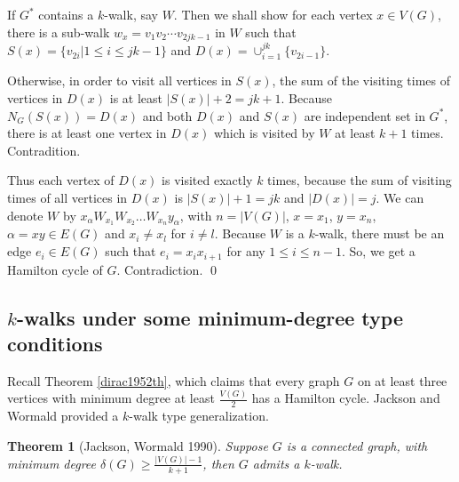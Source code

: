 \documentclass[12pt]{report}
\newtheorem{theorem}{Theorem}
\begin{document}
If $G^*$ contains a $k$-walk, say $W$. Then we shall show for each vertex $x\in V(G)$, there is a sub-walk $w_x=v_1v_2\cdots v_{2jk-1}$ in $W$ such that $S(x)=\{v_{2i}|1\le i\le jk-1\}$ and $D(x)=\cup_{i=1}^{jk}\{v_{2i-1}\}$.

Otherwise, in order to visit all vertices in $S(x)$, the sum of the visiting times of vertices in $D(x)$ is at least $|S(x)|+2=jk+1$. Because $N_G(S(x))=D(x)$ and both $D(x)$ and $S(x)$ are independent set in $G^*$, there is at least one vertex in $D(x)$ which is visited by $W$ at least $k+1$ times. Contradition.

Thus each vertex of $D(x)$ is visited exactly $k$ times, because the sum of visiting times of all vertices in $D(x)$ is $|S(x)|+1=jk$ and $|D(x)|=j$. We can denote $W$ by $x_{\alpha}W_{x_1}W_{x_2}\ldots W_{x_n}y_{\alpha}$, with $n=|V(G)|$, $x=x_1$, $y=x_n$, $\alpha=xy\in E(G)$ and $x_i\neq x_l$ for $i\neq l$. Because $W$ is a $k$-walk, there must be an edge $e_i\in E(G)$ such that $e_i=x_ix_{i+1}$ for any $1\le i\le n-1$. So, we get a Hamilton cycle of $G$. Contradiction.
\qed





































\subsection{$k$-walks under some minimum-degree type conditions}
Recall Theorem \ref{dirac1952th}, which claims that every graph $G$ on at least three vertices with minimum degree at least $\frac{V(G)}{2}$ has a Hamilton cycle. Jackson and Wormald provided a $k$-walk type generalization.

\begin{theorem}[Jackson, Wormald 1990]\label{mindekwa1}
Suppose $G$ is a connected graph, with minimum degree $\delta(G)\ge\frac{|V(G)|-1}{k+1}$, then $G$ admits a $k$-walk.
\end{theorem}
\end{document}
